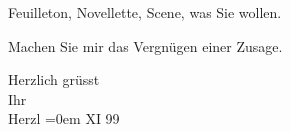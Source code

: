 \pstart
           Feuilleton, Novellette, Scene, was Sie wollen.\pend
           
\pstart
           Machen Sie mir das Vergnügen einer Zusage.\pend
           
\pstart
           Herzlich grüsst{\\[\baselineskip]}Ihr{\\[\baselineskip]}\spacefill\mbox{Herzl}\pend
           \leftskip=0em{}
 XI 99\pend
           \endnumbering{}
\begin{anhang}
\end{anhang}\newcommand{\dateiname}{L03868}\newcommand{\titel}{Theodor Herzl an Arthur Schnitzler, 6. 11. 1899}\newcommand{\editorInnen}{Selma Jahnke und Martin Anton Müller}
